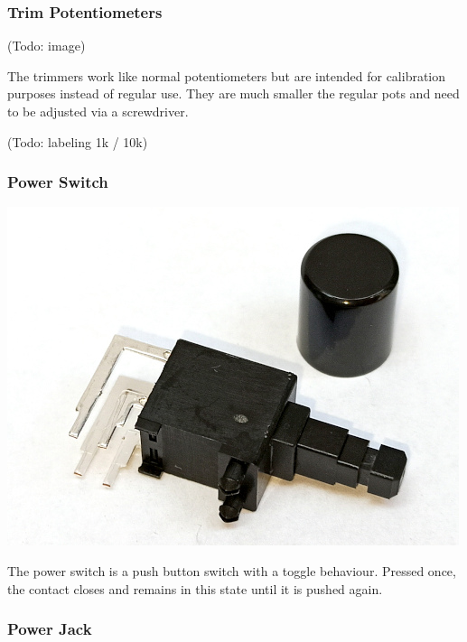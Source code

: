 \documentclass{scrartcl}
\begin{document}
\subsubsection{Trim Potentiometers}

\begin{center}
    (Todo: image)
\end{center}

The trimmers work like normal potentiometers but are intended for calibration purposes instead of regular use. They are much smaller the regular pots and need to be adjusted via a screwdriver.

(Todo: labeling 1k / 10k)

\subsubsection{Power Switch}

\begin{center}
    \includegraphics[scale=0.5]{assets/zekit-powerswitch-resized.jpg}
\end{center}

The power switch is a push button switch with a toggle behaviour. Pressed once, the contact closes and remains in this state until it is pushed again.

\subsubsection{Power Jack}
\end{document}
